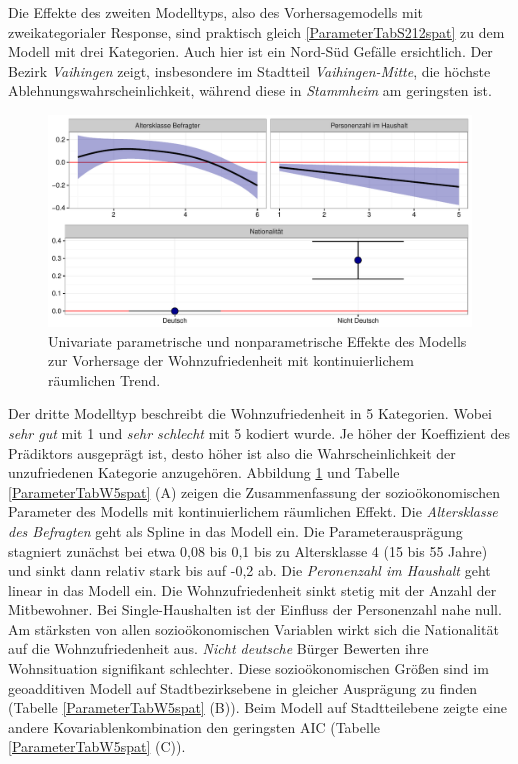 \documentclass{Vorlage}
\begin{document}
Die Effekte des zweiten Modelltyps, also des Vorhersagemodells mit zweikategorialer Response, sind praktisch gleich \ref{ParameterTabS212spat} zu dem Modell mit drei Kategorien. Auch hier ist ein Nord-Süd Gefälle ersichtlich. Der Bezirk \textit{Vaihingen} zeigt, insbesondere im Stadtteil \textit{Vaihingen-Mitte}, die höchste Ablehnungswahrscheinlichkeit, während diese in \textit{Stammheim} am geringsten ist.\\
\begin{figure}[h]
 \begin{center}
 \includegraphics[scale=0.8]{Pictures/BWModelEffects2}
 \caption{Univariate parametrische und nonparametrische Effekte des Modells zur Vorhersage der Wohnzufriedenheit mit kontinuierlichem räumlichen Trend.}
 \label{BWParam}
 \end{center}
\end{figure}
Der dritte Modelltyp beschreibt die Wohnzufriedenheit in 5 Kategorien. Wobei \textit{sehr gut} mit 1 und \textit{sehr schlecht} mit 5 kodiert wurde. Je höher der Koeffizient des Prädiktors ausgeprägt ist, desto höher ist also die Wahrscheinlichkeit der unzufriedenen Kategorie anzugehören. Abbildung \ref{BWParam} und Tabelle \ref{ParameterTabW5spat} (A) zeigen die Zusammenfassung der sozioökonomischen Parameter des Modells mit kontinuierlichem räumlichen Effekt. Die \textit{Altersklasse des Befragten} geht als Spline in das Modell ein. Die Parameterausprägung stagniert zunächst bei etwa 0,08 bis 0,1 bis zu Altersklasse 4 (15 bis 55 Jahre) und sinkt dann relativ stark bis auf -0,2 ab. Die \textit{Peronenzahl im Haushalt} geht linear in das Modell ein. Die Wohnzufriedenheit sinkt stetig mit der Anzahl der Mitbewohner. Bei Single-Haushalten ist der Einfluss der Personenzahl nahe null. Am stärksten von allen sozioökonomischen Variablen wirkt sich die Nationalität auf die Wohnzufriedenheit aus. \textit{Nicht deutsche} Bürger Bewerten ihre Wohnsituation signifikant schlechter. Diese  sozioökonomischen Größen sind im geoadditiven Modell auf Stadtbezirksebene in gleicher Ausprägung zu finden (Tabelle \ref{ParameterTabW5spat} (B)). Beim Modell auf Stadtteilebene zeigte eine andere Kovariablenkombination den geringsten AIC (Tabelle \ref{ParameterTabW5spat} (C)).\\
\end{document}
